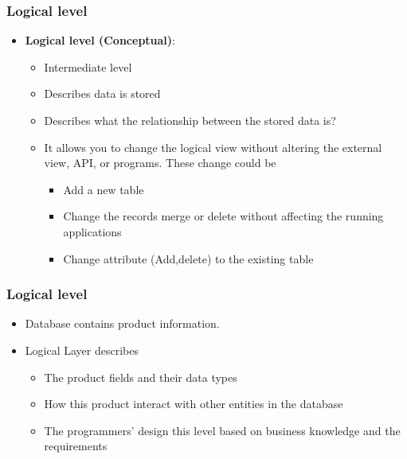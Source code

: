 \begin{frame}
	\frametitle{Logical level}
	\begin{itemize}[<+->]
		\item \textbf{Logical level (Conceptual)}: 
		\begin{itemize}[<+->]
			\item Intermediate level
			\item Describes \textbf{\underline{}} data is stored
			\item Describes what the relationship between the stored data is?
			\item It allows you to change the logical view without altering the external view, API, or programs. These change could be
			\begin{itemize}[<+->]
				\item Add a new table
				\item Change the records merge or delete without affecting the running applications
				\item Change attribute (Add,delete) to the existing table
			\end{itemize}									
		\end{itemize}		
	\end{itemize}	 
\end{frame}
\begin{frame}
	\frametitle{Logical level}
	\begin{example}
		\begin{itemize}[<+->]
			\item Database contains product information.
			\item Logical Layer describes
			\begin{itemize}[<+->]
				\item The product fields and their data types
				\item How this product interact with other entities in the database
				\item The programmers' design this level based on business knowledge and the requirements
			\end{itemize}
		\end{itemize}
	\end{example}
	
\end{frame}


